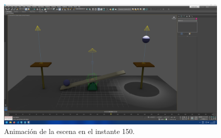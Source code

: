 \documentclass{article}
\begin{document}
 \begin{figure}[H]
    \centering
    \includegraphics[width=\textwidth]{imagenes/animaciones/general/150.png}
    \caption{Animación de la escena en el instante 150.}
 \end{figure}
\end{document}
